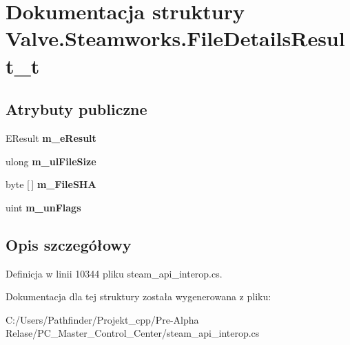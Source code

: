 \hypertarget{struct_valve_1_1_steamworks_1_1_file_details_result__t}{}\section{Dokumentacja struktury Valve.\+Steamworks.\+File\+Details\+Result\+\_\+t}
\label{struct_valve_1_1_steamworks_1_1_file_details_result__t}
\subsection*{Atrybuty publiczne}
\begin{DoxyCompactItemize}
\item 
\mbox{\label{struct_valve_1_1_steamworks_1_1_file_details_result__t_aa9a8d2c4014bc6532f11be23875e28c0}} 
E\+Result {\bfseries m\+\_\+e\+Result}
\item 
\mbox{\label{struct_valve_1_1_steamworks_1_1_file_details_result__t_a3e6cb0444ad39c0b38c8acf1d166524f}} 
ulong {\bfseries m\+\_\+ul\+File\+Size}
\item 
\mbox{\label{struct_valve_1_1_steamworks_1_1_file_details_result__t_ac0773c7894d3b60c9de360b71fe41114}} 
byte \mbox{[}$\,$\mbox{]} {\bfseries m\+\_\+\+File\+S\+HA}
\item 
\mbox{\label{struct_valve_1_1_steamworks_1_1_file_details_result__t_ac12b9773a674d304159083f4e9df4813}} 
uint {\bfseries m\+\_\+un\+Flags}
\end{DoxyCompactItemize}


\subsection{Opis szczegółowy}


Definicja w linii 10344 pliku steam\+\_\+api\+\_\+interop.\+cs.



Dokumentacja dla tej struktury została wygenerowana z pliku\+:\begin{DoxyCompactItemize}
\item 
C\+:/\+Users/\+Pathfinder/\+Projekt\+\_\+cpp/\+Pre-\/\+Alpha Relase/\+P\+C\+\_\+\+Master\+\_\+\+Control\+\_\+\+Center/steam\+\_\+api\+\_\+interop.\+cs\end{DoxyCompactItemize}

